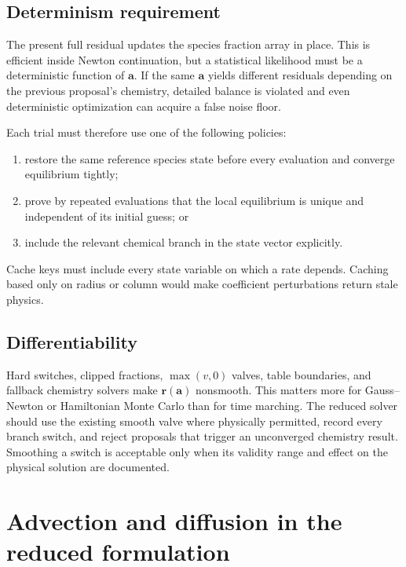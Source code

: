 \documentclass[english,a4paper]{my_memo}
\newcommand{\vect}[1]{\mathbf{#1}}
\newcommand{\coef}{\vect{a}}
\begin{document}
\subsection{Determinism requirement}

The present full residual updates the species fraction array in place.  This is
efficient inside Newton continuation, but a statistical likelihood must be a
deterministic function of \(\coef\).  If the same \(\coef\) yields different
residuals depending on the previous proposal's chemistry, detailed balance is
violated and even deterministic optimization can acquire a false noise floor.

Each trial must therefore use one of the following policies:
\begin{enumerate}
\item restore the same reference species state before every evaluation and
  converge equilibrium tightly;
\item prove by repeated evaluations that the local equilibrium is unique and
  independent of its initial guess; or
\item include the relevant chemical branch in the state vector explicitly.
\end{enumerate}
Cache keys must include every state variable on which a rate depends.  Caching
based only on radius or column would make coefficient perturbations return stale
physics.

\subsection{Differentiability}

Hard switches, clipped fractions, \(\max(v,0)\) valves, table boundaries, and
fallback chemistry solvers make \(\vect{r}(\coef)\) nonsmooth.  This matters
more for Gauss--Newton or Hamiltonian Monte Carlo than for time marching.  The
reduced solver should use the existing smooth valve where physically permitted,
record every branch switch, and reject proposals that trigger an unconverged
chemistry result.  Smoothing a switch is acceptable only when its validity range
and effect on the physical solution are documented.

\section{Advection and diffusion in the reduced formulation}
\label{sec:transport}
\end{document}
